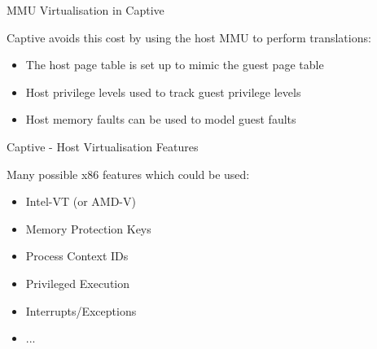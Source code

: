 \begin{frame}{MMU Virtualisation in Captive}

Captive avoids this cost by using the host MMU to perform translations:

\begin{itemize}
\item The host page table is set up to mimic the guest page table
\item Host privilege levels used to track guest privilege levels
\item Host memory faults can be used to model guest faults
\end{itemize}

\end{frame}

\begin{frame}{Captive - Host Virtualisation Features}

Many possible x86 features which could be used:

\begin{itemize}
	\item Intel-VT (or AMD-V)
	\item Memory Protection Keys
	\item Process Context IDs
	\item Privileged Execution
	\item Interrupts/Exceptions
	\item ...
\end{itemize}

\end{frame}
